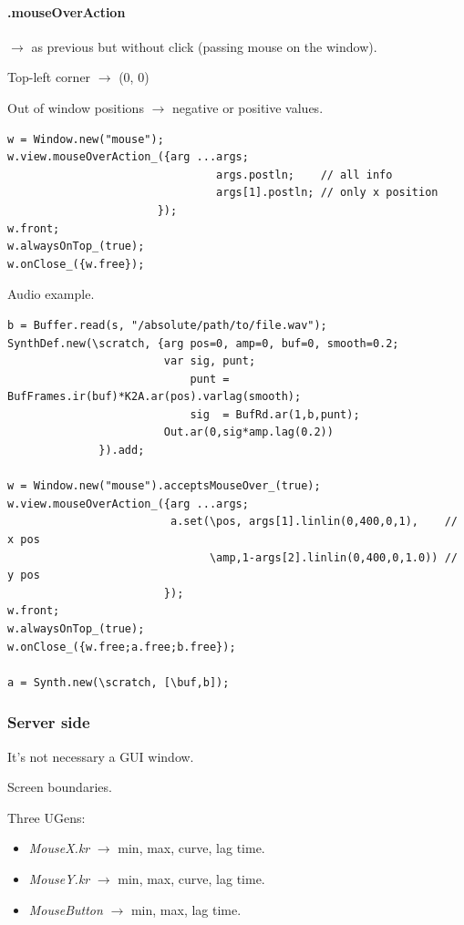 \paragraph{.mouseOverAction} \(\rightarrow\) as previous but without click (passing mouse on the window).

Top-left corner \(\rightarrow\) (0, 0)

Out of window positions \(\rightarrow\) negative or positive values.

\begin{lstlisting}[frame=single, caption=mouseOverAction model] 
w = Window.new("mouse");
w.view.mouseOverAction_({arg ...args;
                                args.postln;    // all info
                                args[1].postln; // only x position
                       });
w.front;
w.alwaysOnTop_(true);
w.onClose_({w.free});
\end{lstlisting} 

Audio example.

\begin{lstlisting}[frame=single] 
b = Buffer.read(s, "/absolute/path/to/file.wav");
SynthDef.new(\scratch, {arg pos=0, amp=0, buf=0, smooth=0.2;
                        var sig, punt;
                            punt = BufFrames.ir(buf)*K2A.ar(pos).varlag(smooth);
                            sig  = BufRd.ar(1,b,punt);
                        Out.ar(0,sig*amp.lag(0.2))
              }).add;

w = Window.new("mouse").acceptsMouseOver_(true); 
w.view.mouseOverAction_({arg ...args;
                         a.set(\pos, args[1].linlin(0,400,0,1),    // x pos
                               \amp,1-args[2].linlin(0,400,0,1.0)) // y pos
                        });
w.front;
w.alwaysOnTop_(true);
w.onClose_({w.free;a.free;b.free});

a = Synth.new(\scratch, [\buf,b]);	
\end{lstlisting} 

\subsubsection{Server side}\label{mouse-server-side}

It's not necessary a GUI window.

Screen boundaries.

Three UGens:

\begin{itemize}
\tightlist
\item \textit{MouseX.kr} \(\rightarrow\) min, max, curve, lag time.
\item \textit{MouseY.kr} \(\rightarrow\) min, max, curve, lag time.
\item \textit{MouseButton} \(\rightarrow\) min, max, lag time.
\end{itemize}


